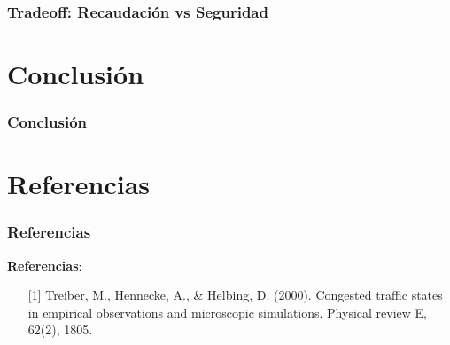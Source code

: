 \documentclass[10pt, compress]{beamer}
\begin{document}
\begin{frame}
\frametitle{Tradeoff: Recaudaci\'on vs Seguridad}
\end{frame}

\section{Conclusi\'on}

\begin{frame}
\frametitle{Conclusi\'on}
\end{frame}

\section{Referencias}

\begin{frame}[fragile]

\frametitle{Referencias}

\textbf{Referencias}:
\begin{itemize}
\item [{[1]}] Treiber, M., Hennecke, A., \& Helbing, D. (2000). Congested traffic states in empirical observations and microscopic simulations. Physical review E, 62(2), 1805.
\end{itemize}

\end{frame}

\end{document}
